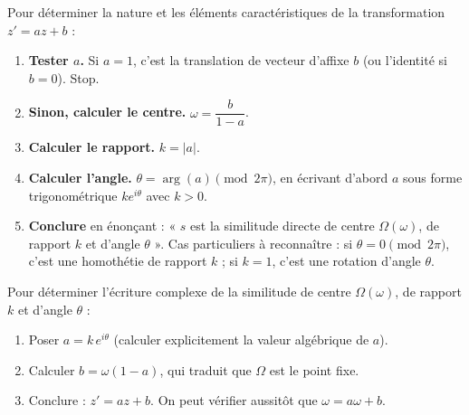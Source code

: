 \documentclass[11pt]{article}
\begin{document}
\begin{methode}
Pour déterminer la nature et les éléments caractéristiques de la transformation $z' = az + b$ :
\begin{enumerate}
\item \textbf{Tester $a$.} Si $a = 1$, c'est la translation de vecteur d'affixe $b$ (ou l'identité si $b = 0$). Stop.
\item \textbf{Sinon, calculer le centre.} $\omega = \dfrac{b}{1 - a}$.
\item \textbf{Calculer le rapport.} $k = |a|$.
\item \textbf{Calculer l'angle.} $\theta = \arg(a) \pmod{2\pi}$, en écrivant d'abord $a$ sous forme trigonométrique $k e^{i\theta}$ avec $k > 0$.
\item \textbf{Conclure} en énonçant : « $s$ est la similitude directe de centre $\Omega(\omega)$, de rapport $k$ et d'angle $\theta$ ». Cas particuliers à reconnaître : si $\theta = 0 \pmod{2\pi}$, c'est une homothétie de rapport $k$ ; si $k = 1$, c'est une rotation d'angle $\theta$.
\end{enumerate}
\end{methode}

\begin{methode}[Écrire $z' = az + b$ connaissant le centre, le rapport et l'angle]
Pour déterminer l'écriture complexe de la similitude de centre $\Omega(\omega)$, de rapport $k$ et d'angle $\theta$ :
\begin{enumerate}
\item Poser $a = k\,e^{i\theta}$ (calculer explicitement la valeur algébrique de $a$).
\item Calculer $b = \omega(1 - a)$, qui traduit que $\Omega$ est le point fixe.
\item Conclure : $z' = az + b$. On peut vérifier aussitôt que $\omega = a\omega + b$.
\end{enumerate}
\end{methode}
\end{document}
